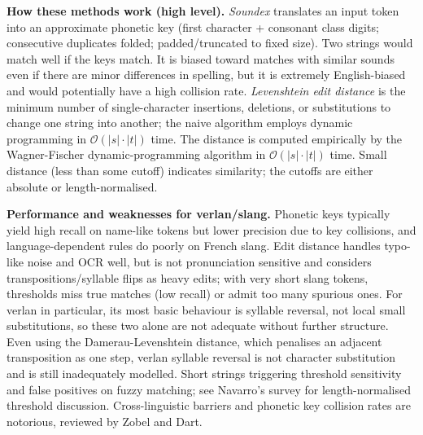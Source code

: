 \documentclass[12pt]{article}
\begin{document}
\noindent\textbf{How these methods work (high level).} \textit{Soundex} translates an input token into an approximate phonetic key (first character + consonant class digits; consecutive duplicates folded; padded/truncated to fixed size). Two strings would match well if the keys match. It is biased toward matches with similar sounds even if there are minor differences in spelling, but it is extremely English-biased and would potentially have a high collision rate. \textit{Levenshtein edit distance} is the minimum number of single-character insertions, deletions, or substitutions to change one string into another; the naive algorithm employs dynamic programming in \( \mathcal{O}(|s|\cdot|t|) \) time. The distance is computed empirically by the Wagner-Fischer dynamic-programming algorithm in \( \mathcal{O}(|s|\cdot|t|) \) time. Small distance (less than some cutoff) indicates similarity; the cutoffs are either absolute or length-normalised. \cite{wagner1974string}

\noindent\textbf{Performance and weaknesses for verlan/slang.} Phonetic keys typically yield high recall on name-like tokens but lower precision due to key collisions, and language-dependent rules do poorly on French slang. Edit distance handles typo-like noise and OCR well, but is not pronunciation sensitive and considers transpositions/syllable flips as heavy edits; with very short slang tokens, thresholds miss true matches (low recall) or admit too many spurious ones. For verlan in particular, its most basic behaviour is syllable reversal, not local small substitutions, so these two alone are not adequate without further structure. Even using the Damerau-Levenshtein distance, which penalises an adjacent transposition as one step, verlan syllable reversal is not character substitution and is still inadequately modelled. Short strings triggering threshold sensitivity and false positives on fuzzy matching; see Navarro's survey for length-normalised threshold discussion. Cross-linguistic barriers and phonetic key collision rates are notorious, reviewed by Zobel and Dart. \cite{damerau1964,navarro2001approximate,zobel1996phonetic}
\end{document}
